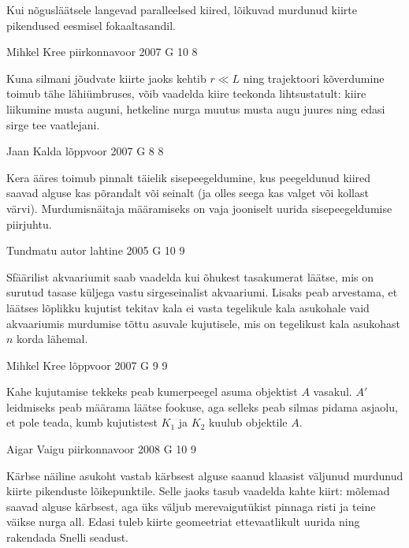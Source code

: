 \documentclass[11pt, twoside]{article}
\begin{document}
{{\ifHint
Kui nõgusläätsele langevad paralleelsed kiired, lõikuvad
murdunud kiirte pikendused eesmisel fokaaltasandil.
\fi
}

{Mihkel Kree} %
{piirkonnavoor} %
{2007} %
{G 10} %
{8} %
{

\ifHint
Kuna silmani jõudvate kiirte jaoks kehtib $r \ll L$ ning trajektoori kõverdumine toimub tähe lähiümbruses, võib vaadelda kiire teekonda lihtsustatult: kiire liikumine musta auguni, hetkeline nurga muutus musta augu juures ning edasi sirge tee vaatlejani.
\fi
}

{Jaan Kalda} %
{lõppvoor} %
{2007} %
{G 8} %
{8} %
{

\ifHint
Kera ääres toimub pinnalt täielik sisepeegeldumine, kus peegeldunud kiired saavad alguse kas põrandalt või seinalt (ja olles seega kas valget või kollast värvi). Murdumisnäitaja määramiseks on vaja jooniselt uurida sisepeegeldumise piirjuhtu.
\fi
}

{Tundmatu autor} %
{lahtine} %
{2005} %
{G 10} %
{9} %
{

\ifHint
Sfäärilist akvaariumit saab vaadelda kui õhukest tasakumerat läätse, mis on surutud tasase küljega vastu sirgeseinalist akvaariumi. Lisaks peab arvestama, et läätses lõplikku kujutist tekitav kala ei vasta tegelikule kala asukohale vaid akvaariumis murdumise tõttu asuvale kujutisele, mis on tegelikust kala asukohast $n$ korda lähemal.
\fi
}

{Mihkel Kree} %
{lõppvoor} %
{2007} %
{G 9} %
{9} %
{

\ifHint
Kahe kujutamise tekkeks peab kumerpeegel asuma objektist $A$ vasakul. $A'$ leidmiseks peab määrama läätse fookuse, aga selleks peab silmas pidama asjaolu, et pole teada, kumb kujutistest $K_1$ ja $K_2$ kuulub objektile $A$.
\fi
}

{Aigar Vaigu} %
{piirkonnavoor} %
{2008} %
{G 10} %
{9} %
{

\ifHint
Kärbse näiline asukoht vastab kärbsest alguse saanud klaasist väljunud murdunud kiirte pikenduste lõikepunktile. Selle jaoks tasub vaadelda kahte kiirt: mõlemad saavad alguse kärbsest, aga üks väljub merevaigutükist pinnaga risti ja teine väikse nurga all. Edasi tuleb kiirte geomeetriat ettevaatlikult uurida ning rakendada Snelli seadust.
\fi
}

}
\end{document}
